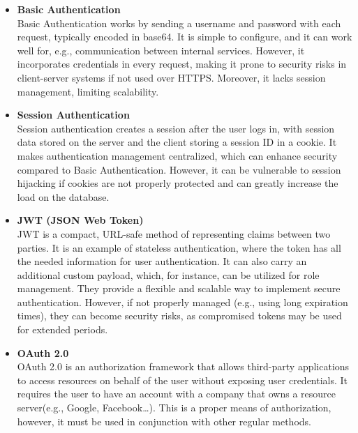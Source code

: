 \begin{itemize}
    \item \textbf{Basic Authentication} \\
    Basic Authentication works by sending a username and password with each request,
    typically encoded in base64.\cite{basic_auth} It is simple to configure, and it can work well for, e.g., communication between internal services. However, it incorporates credentials in every request,
    making it prone to security risks in client-server systems if not used over HTTPS.
    Moreover, it lacks session management, limiting scalability.

    \item \textbf{Session Authentication} \\
    Session authentication creates a session after the user logs in, with session
    data stored on the server and the client storing a session ID in a cookie.
    It makes authentication management centralized, which can enhance security compared to Basic Authentication.
    However, it can be vulnerable to session hijacking if cookies are not properly protected and can greatly increase the load on the database.\cite{session_auth}

    \item \textbf{JWT (JSON Web Token)} \\
    JWT is a compact, URL-safe method of representing claims between two parties.\cite{jwt}
    It is an example of stateless authentication, where the token has all the needed information for user authentication.
    It can also carry an additional custom payload, which, for instance, can be utilized for role management.
    They provide a flexible and scalable way to implement secure authentication.
    However, if not properly managed (e.g., using long expiration times), they can become security risks,
    as compromised tokens may be used for extended periods.

    \item \textbf{OAuth 2.0} \\
    OAuth 2.0 is an authorization framework that allows third-party applications to access resources
    on behalf of the user without exposing user credentials.\cite{oauth2} It requires the user to have an account
    with a company that owns a resource server(e.g., Google, Facebook\ldots). This is a proper means of
    authorization, however, it must be used in conjunction with other regular methods.
\end{itemize}

